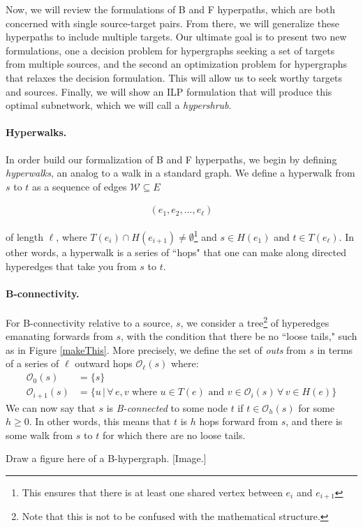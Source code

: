 \documentclass[12pt,twoside]{reedthesis}
\newcommand{\new}[2]{{\color{red}#1 [#2]}}
\theoremstyle{definition}
\begin{document}
Now, we will review the formulations of B and F hyperpaths, which are both concerned with single source-target pairs. From there, we will generalize these hyperpaths to include multiple targets. Our ultimate goal is to present two new formulations, one a decision problem for hypergraphs seeking a set of targets from multiple sources, and the second an optimization problem for hypergraphs that relaxes the decision formulation. This will allow us to seek worthy targets and sources. Finally, we will show an ILP formulation that will produce this optimal subnetwork, which we will call a \textit{hypershrub}.\par

\paragraph{Hyperwalks.}In order build our formalization of B and F hyperpaths, we begin by defining \textit{hyperwalks}, an analog to a walk in a standard graph. We define a hyperwalk from $s$ to $t$ as a sequence of edges $\mathcal{W} \subseteq E$

\begin{align*}
  (e_1,e_2,...,e_\ell)
\end{align*}

of length $\ell$, where $T(e_i) \cap H(e_{i+1}) \neq \emptyset$\footnote{This ensures that there is at least one shared vertex between $e_i$ and $e_{i+1}$} and $s \in H(e_1)$ and $t \in T(e_\ell)$. In other words, a hyperwalk is a series of ``hops" that one can make along directed hyperedges that take you from $s$ to $t$.\par

\paragraph{B-connectivity.}For B-connectivity relative to a source, $s$, we consider a tree\footnote{Note that this is not to be confused with the mathematical structure.} of hyperedges emanating forwards from $s$, with the condition that there be no ``loose tails," such as in Figure \ref{makeThis}. More precisely, we define the set of \textit{outs} from $s$ in terms of a series of $\ell$ outward hops $\mathcal{O}_\ell(s)$ where:
\begin{align*}
  \mathcal{O}_0(s)&=\{s\}\\
  \mathcal{O}_{i+1}(s)&=\{u\,|\,\forall\,e,v \text{ where } u \in T(e) \text{ and } v \in \mathcal{O}_i(s)\,\forall\,v \in H(e)\}
\end{align*}
We can now say that $s$ is \textit{B-connected} to some node $t$ if $t \in \mathcal{O}_h(s)$ for some $h \geq 0$. In other words, this means that $t$ is $h$ hops forward from $s$, and there is some walk from $s$ to $t$ for which there are no loose tails.\par
\new{
Draw a figure here of a B-hypergraph.
}{Image.}
\end{document}

